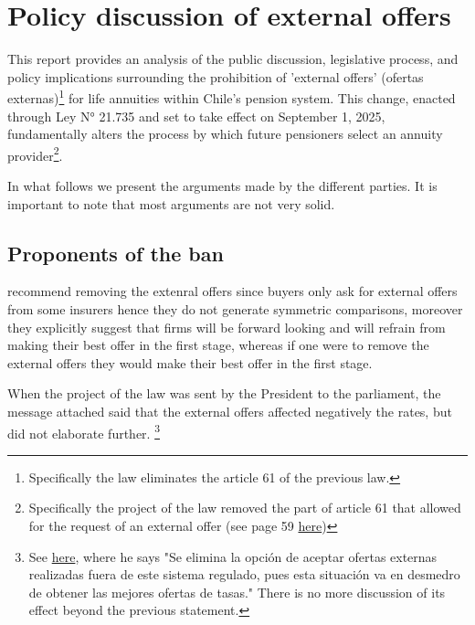 \documentclass[12pt]{article}
\theoremstyle{plain}
\theoremstyle{plain}
\begin{document}
 

\section{Policy discussion of external offers}
This report provides an analysis of the public discussion, legislative process, and policy implications surrounding the prohibition of 'external offers' (ofertas externas)\footnote{Specifically the law eliminates the article 61 of the previous law. } for life annuities within Chile's pension system. This change, enacted through Ley N° 21.735 and set to take effect on September 1, 2025, fundamentally alters the process by which future pensioners select an annuity provider\footnote{Specifically the project of the law removed the part of article 61 that allowed for the request of an external offer (see page 59 \href{https://www.camara.cl/verDoc.aspx?prmID=26258&prmTIPO=INFORMEPLEY}{here})}. 

In what follows we present the arguments made by the different parties. It is important to note that most arguments are not very solid. 



\subsection{Proponents of the ban}

\textcite{fne_estudio_2021} recommend removing the extenral offers since buyers only ask for external offers from some insurers hence they do not generate symmetric comparisons, moreover they explicitly suggest that firms will be forward looking and will refrain from making their best offer in the first stage, whereas if one were to remove the external offers they would make their best offer in the first stage. 

When the project of the law was sent by the President to the parliament, the message attached said that the external offers affected negatively the rates, but did not elaborate further.  \footnote{See \href{https://www.camara.cl/verDoc.aspx?prmID=30946&prmTIPO=OFICIOPLEY}{here}, where he says "Se elimina la opción de aceptar ofertas externas realizadas fuera de este sistema regulado, pues esta situación va en desmedro de obtener las mejores ofertas de tasas." There is no more discussion of its effect beyond the previous statement.}
\end{document}
